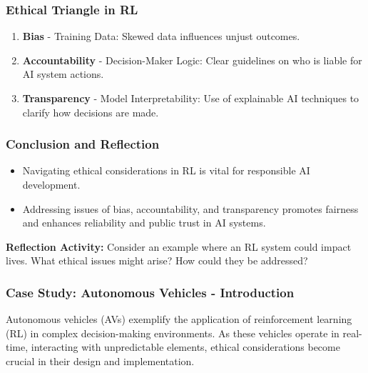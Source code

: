 \documentclass{beamer}
\begin{document}
\begin{frame}[fragile]
    \frametitle{Ethical Triangle in RL}
    \begin{enumerate}
        \item \textbf{Bias} - Training Data: Skewed data influences unjust outcomes.
        \item \textbf{Accountability} - Decision-Maker Logic: Clear guidelines on who is liable for AI system actions.
        \item \textbf{Transparency} - Model Interpretability: Use of explainable AI techniques to clarify how decisions are made.
    \end{enumerate}
\end{frame}

\begin{frame}[fragile]
    \frametitle{Conclusion and Reflection}
    \begin{itemize}
        \item Navigating ethical considerations in RL is vital for responsible AI development.
        \item Addressing issues of bias, accountability, and transparency promotes fairness and enhances reliability and public trust in AI systems.
    \end{itemize}
    
    \textbf{Reflection Activity:} Consider an example where an RL system could impact lives. What ethical issues might arise? How could they be addressed?
\end{frame}

\begin{frame}[fragile]
    \frametitle{Case Study: Autonomous Vehicles - Introduction}
    Autonomous vehicles (AVs) exemplify the application of reinforcement learning (RL) in complex decision-making environments. 
    As these vehicles operate in real-time, interacting with unpredictable elements, ethical considerations become crucial in their design and implementation.
\end{frame}
\end{document}
